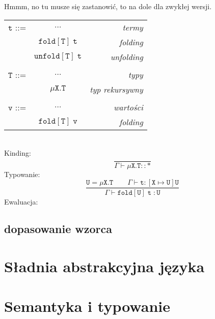 \documentclass[11pt,leqno]{article}
\begin{document}
Hmmm, no tu musze się zastanowić, to na dole dla zwykłej wersji. \\
\begin{tabular}{| l c r |}
  \hline
  $\mathtt{t}$ ::= & $\dots$ & \textit{termy}  \\
   & $\mathtt{fold[T]\;t}$ & \textit{folding} \\
   & $\mathtt{unfold[T]\;t}$ & \textit{unfolding}\\
   & & \\
  $\mathtt{T}$ ::= & $\dots$ & \textit{typy}  \\
   & $\mathtt{\mu X.T}$ & \textit{typ rekursywny} \\
   & & \\
  $\mathtt{v}$ ::= & $\dots$ & \textit{wartości}  \\
   & $\mathtt{fold[T]\;v}$ & \textit{folding} \\
  \hline  
\end{tabular} \\
Kinding:
 	\[\mathtt{\frac{}{\Gamma \vdash \mu X.T::\ast}
		}
	\]
Typowanie:
 	\[\mathtt{ \frac{ U=\mu X.T \hspace{2em} \Gamma \vdash t:[X\mapsto U]U}{\Gamma \vdash fold[U]\;t\; : U}
		}
	\]
Ewaluacja:
 	\[\mathtt{
		}
	\]

\subsection{dopasowanie wzorca}

\section{Sładnia abstrakcyjna języka}
\setcounter{equation}{0}



\section{Semantyka i typowanie}                                 
\setcounter{equation}{0}
\end{document}
